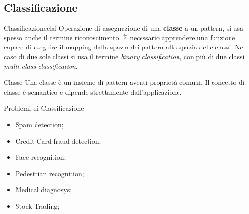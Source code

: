 \subsection{Classificazione}\label{sub:classificazione} %
\begin{definition}{Classificazione}{clsf}
    Operazione di assegnazione di una \textbf{classe} a un pattern, si usa spesso anche il termine riconoscimento.
    È necessario apprendere una funzione capace di eseguire il mapping dallo spazio dei pattern allo spazio delle classi.
    Nel caso di due sole classi si usa il termine \textit{binary classification}, con più di due classi \textit{multi-class classification}.
\end{definition}
\begin{definition}{Classe}{}
    Una classe è un insieme di pattern aventi proprietà comuni. Il concetto di classe è semantico e dipende strettamente dall'applicazione.
\end{definition}
\begin{example}{Problemi di Classificazione}{}
    \begin{itemize}
        \item Spam detection;
        \item Credit Card fraud detection;
        \item Face recognition;
        \item Pedestrian recognition;
        \item Medical diagnosys;
        \item Stock Trading;
    \end{itemize}
\end{example}
%
%
